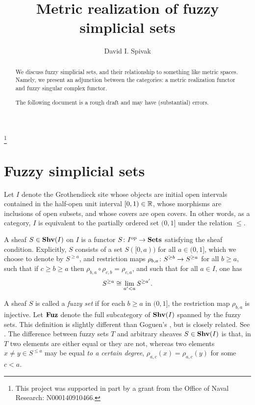 \documentclass{amsart}
\def\Shv{\She}
\def\Fuz{{\bf Fuz}}
\begin{document}
\begin{abstract}

We discuss fuzzy simplicial sets, and their relationship to something like metric spaces.  Namely, we present an adjunction between the categories: a metric realization functor and fuzzy singular complex functor.

The following document is a rough draft and may have (substantial) errors.

\end{abstract}

\title{Metric realization of fuzzy simplicial sets}

\author{David I. Spivak}

\thanks{This project was supported in part by a grant from the Office of Naval Research: N000140910466.}

\maketitle

\section{Fuzzy simplicial sets}

Let $I$ denote the Grothendieck site whose objects are initial open intervals contained in the half-open unit interval $[0,1)\in{\mathbb R}$, whose morphisms are inclusions of open subsets, and whose covers are open covers.  In other words, as a category, $I$ is equivalent to the partially ordered set $(0,1]$ under the relation $\leq$.  

A sheaf $S\in\Shv(I)$ on $I$ is a functor $S\colon I^\textnormal{op}\rightarrow{\bf Sets}$ satisfying the sheaf condition.  Explicitly, $S$ consists of a set $S([0,a))$ for all $a\in(0,1]$, which we choose to denote by $S^{\geq a}$,  and restriction maps $\rho_{b,a}\colon S^{\geq b}\rightarrow S^{\geq a}$ for all $b\geq a$, such that if $c\geq b\geq a$ then $\rho_{b,a}\circ\rho_{c,b}=\rho_{c,a}$, and such that for all $a\in I$, one has $$S^{\geq a}\cong\lim_{a'<a}S^{\geq a'}.$$

A sheaf $S$ is called a {\em fuzzy set} if for each $b\geq a$ in $(0,1]$, the restriction map $\rho_{b,a}$ is injective.  Let $\Fuz$ denote the full subcategory of $\Shv(I)$ spanned by the fuzzy sets.  This definition is slightly different than Goguen's \cite{Gog}, but is closely related.  See \cite{Bar}.  The difference between fuzzy sets $T$ and arbitrary sheaves $S\in\Shv(I)$ is that, in $T$ two elements are either equal or they are not, whereas two elements $x\neq y\in S^{\leq a}$ may be equal {\em to a certain degree}, $\rho_{a,c}(x)=\rho_{a,c}(y)$ for some $c<a$.
\end{document}
